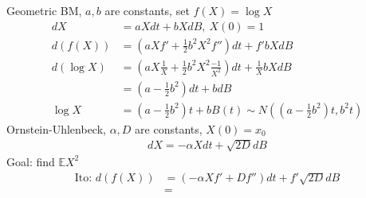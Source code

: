 \documentclass[12pt, letterpaper]{article}
\begin{document}
 Geometric BM, $a,b$ are constants, set $f(X) = \log X$
\begin{align*}
    dX &= aXdt + bXdB,\ X(0) = 1 \\
    d(f(X)) &= (aXf' + \frac 12 b^2X^2f'')dt + f'bXdB \\
    d(\log X) &= (aX\frac 1X + \frac 12 b^2 X^2 \frac{-1}{X^2})dt + \frac 1X bXdB \\
    &= (a-\frac 12 b^2)dt + bdB \\
    \log X &= (a-\frac 12b^2)t + bB(t) \sim N((a-\frac 12 b^2)t, b^2t)
\end{align*}
 Ornstein-Uhlenbeck, $\alpha, D$ are constants, $X(0) = x_0$
\begin{align*}
    dX = -\alpha X dt + \sqrt{2D} dB
\end{align*}
Goal: find $\mathbb{E}X^2$
\begin{align*}
    \text{Ito: } d(f(X)) &= (-\alpha Xf' + Df'')dt + f'\sqrt{2D}dB \\
    &= 
\end{align*}
\end{document}
